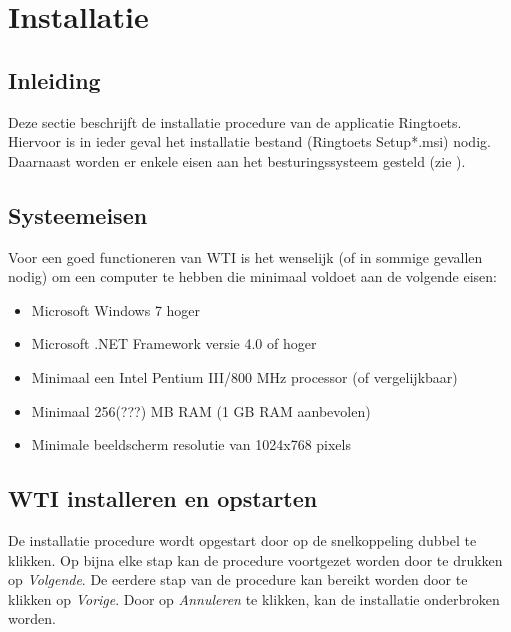 
\chapter{Installatie\label{chap:install}}

\section{Inleiding}
Deze sectie beschrijft de installatie procedure van de applicatie Ringtoets. Hiervoor is in ieder geval het installatie bestand (Ringtoets Setup*.msi) nodig. Daarnaast worden er enkele eisen aan het besturingssysteem gesteld (zie ). 

\section{Systeemeisen}
\label{sec:sysrequirements}
Voor een goed functioneren van WTI is het wenselijk (of in sommige gevallen nodig) om een computer te hebben die minimaal voldoet aan de volgende eisen:
\begin{itemize}
	\item Microsoft Windows 7 hoger
	\item Microsoft .NET Framework versie 4.0 of hoger
	\item Minimaal een Intel Pentium III/800 MHz processor (of vergelijkbaar)
	\item Minimaal 256(???) MB RAM (1 GB RAM aanbevolen)
	\item Minimale beeldscherm resolutie van 1024x768 pixels
\end{itemize}




\section{WTI installeren en opstarten}
\label{sec:wtiinstall}
De installatie procedure wordt opgestart door op de snelkoppeling dubbel te klikken. Op bijna elke stap kan de procedure voortgezet worden door te drukken op \textit{Volgende}. De eerdere stap van de procedure kan bereikt worden door te klikken op \textit{Vorige}. Door op \textit{Annuleren} te klikken, kan de installatie onderbroken worden. 

